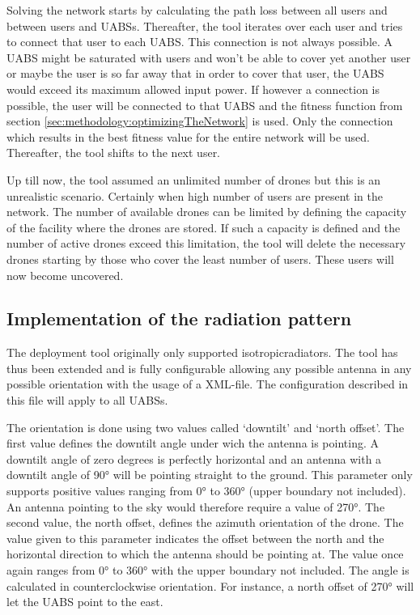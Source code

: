 Solving the network starts by calculating the path loss between all users and between users and \gls{UABS}s.
Thereafter, the tool iterates over each user and tries to connect that user to each \gls{UABS}. This connection is not always possible. A \gls{UABS} might be saturated with users and 
won't be able to cover yet another user or maybe the user is so far away that in order to cover that user, the \gls{UABS} would exceed its maximum allowed input power.
If however a connection is possible, the user will be connected to that \gls{UABS} and the fitness function from section \ref{sec:methodology:optimizingTheNetwork} is used. 
Only the connection which results in the best fitness value for the entire network will be used. Thereafter, the tool shifts to the next user. 

Up till now, the tool assumed an unlimited number of drones but this is an unrealistic scenario. Certainly when high number of users are present in the network.
The number of available drones can be limited by defining the capacity of the facility where the drones are stored. If such a capacity is defined and the number
of active drones exceed this limitation, the tool will delete the necessary drones starting by those who cover the least number of users. These users will now become 
uncovered.

\subsection{Implementation of the radiation pattern}
\label{subsec:implementationradpat}
The deployment tool originally only supported \gls{isotropicradiator}s. The tool has thus been extended and is fully configurable allowing any possible antenna 
in any possible 
orientation with the usage of a XML-file. The configuration described in this file will apply to all \gls{UABS}s. 

The orientation is done using two values called `downtilt' and `north offset'. The first value
defines the downtilt angle under wich the antenna is pointing. A downtilt angle of zero degrees is perfectly horizontal and 
an antenna with a downtilt angle of \ang{90} will be pointing straight to the ground.
This parameter only supports positive values ranging from \ang{0} to \ang{360} (upper boundary not included). An antenna pointing to the sky would therefore require a value of \ang{270}.
The second value, the north offset, defines the azimuth orientation of the drone. The value given to this parameter indicates the offset between the north
and the horizontal direction to which the antenna should be pointing at. The value once again ranges from \ang{0} to \ang{360} with the upper boundary not included. The
angle is calculated in counterclockwise orientation. For instance, a north offset of \ang{270} will let the \gls{UABS} point to the east.  

